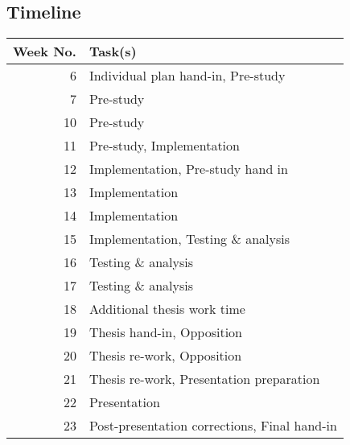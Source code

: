 \documentclass{article}
\begin{document}
\subsection*{Timeline}

\begin{figure*}[h!]
	\begin{tabular}{r|l}
		Week No. & Task(s)                                      \\
		\hline
		6        & Individual plan hand-in, Pre-study           \\
		7        & Pre-study                                    \\
		10       & Pre-study                                    \\
		11       & Pre-study, Implementation                    \\
		12       & Implementation, Pre-study hand in            \\
		13       & Implementation                               \\
		14       & Implementation                               \\
		15       & Implementation, Testing \& analysis          \\
		16       & Testing \& analysis                          \\
		17       & Testing \& analysis                          \\
		18       & Additional thesis work time                  \\
		19       & Thesis hand-in, Opposition                   \\
		20       & Thesis re-work, Opposition                   \\
		21       & Thesis re-work, Presentation preparation     \\
		22       & Presentation                                 \\
		23       & Post-presentation corrections, Final hand-in \\
																																												
	\end{tabular}
\end{figure*}



\end{document}

